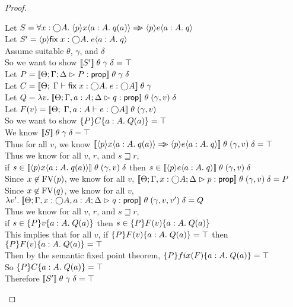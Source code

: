 \begin{proof}
  \begin{tabbedproof}
    \oo Let $S = \forall x:\monad{A}.\; \mspec{p}x{a:A}{q(a)} \specimp \mspec{p}{e}{a:A}{q}$\\
    \oo Let $S' = \mspec{p}{\fix{x:\monad{A}}{e}}{a:A}{q}$ \\
    \oo Assume suitable $\theta$, $\gamma$, and $\delta$ \\
    \ooo So we want to show $\interp{S'}\;\theta\;\gamma\;\delta = \top$ \\
    \ooo Let $P = \interp{\judgeA{P}{\assert}}\;\theta\;\gamma\;\delta$ \\
    \ooo Let $C = \interp{\judgeE{\Gamma}{\fix{x:\monad{A}}{e}}{\monad{A}}}\;\theta\;\gamma$ \\
    \ooo Let $Q = \semfun{v}{\interp{\judgeA[\Theta; \Gamma, a:A; \Delta]{q}{\assert}}\;\theta\;(\gamma, v)\;\delta}$ \\
    \ooo Let $F(v) = \interp{\judgeE{\Gamma, a:A}{e}{\monad{A}}}\;\theta\;(\gamma, v)$ \\
    \ooo So we want to show $\spec{P}{C}{a:A}{Q(a)} = \top$ \\
    \ooo We know $\interp{S}\;\theta\;\gamma\;\delta = \top$ \\
    \ooo Thus for all $v$, we know $\interp{\mspec{p}x{a:A}{q(a)} \specimp \mspec{p}{e}{a:A}{q}}\;\theta\;(\gamma, v)\;\delta = \top$ \\
    \ooo Thus we know for all $v$, $r$, and $s \sqsupseteq r$, \\
    \ooox if $s \in \interp{\mspec{p}x{a:A}{q(a)}}\;\theta\;(\gamma, v)\;\delta$ then $s \in \interp{\mspec{p}{e}{a:A}{q}}\;\theta\;(\gamma, v)\;\delta$ \\
    \ooo Since $x \not\in \FV{p}$, we know for all $v$, 
         $\interp{\judgeA[\Theta; \Gamma,x:\monad{A}; \Delta]{p}{\assert}}\;\theta\;(\gamma, v)\;\delta = P$ \\
    \ooo Since $x \not\in \FV{q}$, we know for all $v$, 
         $\semfun{v'}{\interp{\judgeA[\Theta; \Gamma, x:\monad{A}, a:A; \Delta]{q}{\assert}}\;\theta\;(\gamma,v,v') \;\delta} = Q$ \\
    \ooo Thus we know for all $v$, $r$, and $s \sqsupseteq r$, \\
    \ooox if $s \in  \spec{P}{v}{a:A}{Q(a)}$ then 
             $s \in \spec{P}{F(v)}{a:A}{Q(a)}$ \\
    \ooo This implies that for all $v$, if $\spec{P}{F(v)}{a:A}{Q(a)} = \top $ 
                                        then $\spec{P}{F(v)}{a:A}{Q(a)} = \top$ \\
    \ooo Then by the semantic fixed point theorem, 
          $\spec{P}{fix(F)}{a:A}{Q(a)} = \top$ \\
    \ooo So $\spec{P}{C}{a:A}{Q(a)} = \top$ \\
    \ooo Therefore $\interp{S'}\;\theta\;\gamma\;\delta = \top$ \\
  \end{tabbedproof}
\end{proof}

